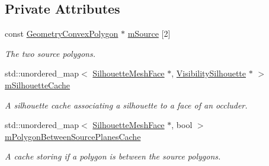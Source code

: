 \subsection*{Private Attributes}
\begin{DoxyCompactItemize}
\item 
\mbox{\label{classvisilib_1_1_silhouette_processor_a62decd2e0655912ba3b3e7c60c055efb}} 
const \mbox{\hyperlink{classvisilib_1_1_geometry_convex_polygon}{Geometry\+Convex\+Polygon}} $\ast$ \mbox{\hyperlink{classvisilib_1_1_silhouette_processor_a62decd2e0655912ba3b3e7c60c055efb}{m\+Source}} \mbox{[}2\mbox{]}
\begin{DoxyCompactList}\small\item\em The two source polygons. \end{DoxyCompactList}\item 
\mbox{\label{classvisilib_1_1_silhouette_processor_a6ff0fa522e3b445f72c1783f3f9618d2}} 
std\+::unordered\+\_\+map$<$ \mbox{\hyperlink{classvisilib_1_1_silhouette_mesh_face}{Silhouette\+Mesh\+Face}} $\ast$, \mbox{\hyperlink{classvisilib_1_1_visibility_silhouette}{Visibility\+Silhouette}} $\ast$ $>$ \mbox{\hyperlink{classvisilib_1_1_silhouette_processor_a6ff0fa522e3b445f72c1783f3f9618d2}{m\+Silhouette\+Cache}}
\begin{DoxyCompactList}\small\item\em A silhouette cache associating a silhouette to a face of an occluder. \end{DoxyCompactList}\item 
\mbox{\label{classvisilib_1_1_silhouette_processor_a8dca97de4e431858335a89e236f3b33b}} 
std\+::unordered\+\_\+map$<$ \mbox{\hyperlink{classvisilib_1_1_silhouette_mesh_face}{Silhouette\+Mesh\+Face}} $\ast$, bool $>$ \mbox{\hyperlink{classvisilib_1_1_silhouette_processor_a8dca97de4e431858335a89e236f3b33b}{m\+Polygon\+Between\+Source\+Planes\+Cache}}
\begin{DoxyCompactList}\small\item\em A cache storing if a polygon is between the source polygons. \end{DoxyCompactList}\item 
\mbox{\label{classvisilib_1_1_silhouette_processor_ae30799e77e708b67a60f8a7da98c8acf}} 

\end{DoxyCompactItemize}
